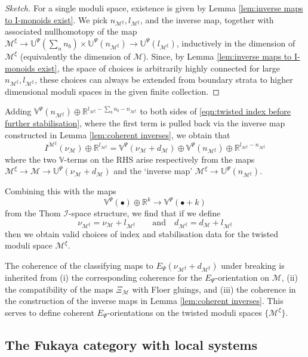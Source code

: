 \documentclass{TPmod}
\def\bR{\mathbb{R}}
\def\bU{\mathbb{U}}
\def\bV{\mathbb{V}}
\newcommand{\cI}{\mathcal{I}}
\newcommand{\cM}{\mathcal{M}}
\numberwithin{equation}{section}
\begin{document}
\begin{proof}[Sketch]
 For a single moduli space, existence is given by Lemma \ref{lem:inverse maps to I-monoids exist}.   We pick $n_{\cM^\xi}, l_{\cM^\xi}$, and the inverse map, together with associated nullhomotopy of the map $\cM^{\xi} \to \bU^{\Psi}(\sum_n n_b) \times \bU^\Psi(n_{\cM^\xi}) \to \bU^\Psi(l_{\cM^\xi})$, inductively in the dimension of $\cM^{\xi}$ (equivalently the dimension of $\cM$).  Since, by  Lemma \ref{lem:inverse maps to I-monoids exist}, the space of choices is arbitrarily highly connected for large $n_{\cM^\xi}, l_{\cM^\xi}$, these choices can always be extended from boundary strata to higher dimensional moduli spaces in the given finite collection.
\end{proof}

Adding $\bV^\Psi(n_{\cM^{\xi}}) \oplus \bR^{l_{\cM^{\xi}} - \sum_b n_b - n_{\cM^{\xi}}}$ to both sides of \eqref{eqn:twisted index before further stabilisation}, where the first term is pulled back via the inverse map constructed in Lemma \ref{lem:coherent inverses}, we obtain that
\[
I^{\cM^{\xi}}(\nu_{\cM}) \oplus \bR^{l_{\cM^{\xi}}} = \bV^{\Psi}(\nu_{\cM} + d_{\cM}) \oplus \bV^{\Psi}(n_{\cM^{\xi}}) \oplus \bR^{l_{\cM^{\xi}} - n_{\cM^{\xi}}}
\]
where the two $\bV$-terms on the RHS arise respectively from the maps $\cM^{\xi} \to \cM \to \bU^{\Psi}(\nu_{\cM}+d_{\cM})$ and the `inverse map' $\cM^{\xi} \to \bU^\Psi(n_{\cM^{\xi}})$.

Combining this with the maps 
\[
\bV^{\Psi}(\bullet) \oplus \bR^k \to \bV^{\Psi}(\bullet+k)
\]
from the Thom $\cI$-space structure, we find that if we define
\begin{equation}
    \nu_{\cM^{\xi}} = \nu_{\cM} + l_{\cM^{\xi}} \qquad \mathrm{and} \quad d_{\cM^{\xi}} = d_{\cM} + l_{\cM^{\xi}}
\end{equation}
then we obtain valid choices of index and stabilisation data for the twisted moduli space $\cM^{\xi}$. 

The coherence of the classifying maps to $E_\Psi(\nu_{\cM^{\xi}} + d_{\cM^{\xi}})$ under breaking is inherited from (i) the corresponding coherence for the $E_{\Psi}$-orientation on $\cM$, (ii) the compatibility of the maps $\Xi_{\cM}$ with Floer gluings, and (iii) the coherence in the construction of the inverse maps in Lemma \ref{lem:coherent inverses}. This serves to define coherent $E_{\Psi}$-orientations on the twisted moduli spaces $\{\cM^{\xi}\}$.

    
\subsection{The Fukaya category with local systems}\label{sec: fuk loc sys}
\end{document}

